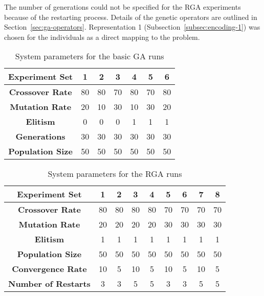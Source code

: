The number of generations could not be specified for the RGA experiments because of the restarting process. Details of the genetic operators are outlined in Section~\ref{sec:ga-operators}. Representation 1 (Subsection~\ref{subsec:encoding-1}) was chosen for the individuals as a direct mapping to the problem. 

\begin{table}
	\centering
	\begin{tabular}{ | >{\bfseries}c | c | c | c | c | c | c | }
		\hline
		Experiment Set & 1 & 2 & 3 & 4 & 5 & 6 \\ \hline
		Crossover Rate & 80 & 80 & 70 & 80 & 70 & 80 \\ \hline
		Mutation Rate & 20 & 10 & 30 & 10 & 30 & 20 \\ \hline
		Elitism & 0 & 0 & 0 & 1 & 1 & 1 \\ \hline
		Generations & 30 & 30 & 30 & 30 & 30 & 30 \\ \hline
		Population Size & 50 & 50 & 50 & 50 & 50 & 50 \\ \hline
	\end{tabular}
	\caption{System parameters for the basic GA runs}
	\label{table:viability-ga}
\end{table}

\begin{table}
	\centering
	\begin{tabular}{ | >{\bfseries}c | c | c | c | c | c | c | c | c | }
		\hline
		Experiment Set & 1 & 2 & 3 & 4 & 5 & 6 & 7 & 8 \\ \hline
		Crossover Rate & 80 & 80 & 80 & 80 & 70 & 70 & 70 & 70 \\ \hline
		Mutation Rate & 20 & 20 & 20 & 20 & 30 & 30 & 30 & 30 \\ \hline
		Elitism & 1 & 1 & 1 & 1 & 1 & 1 & 1 & 1 \\ \hline
		Population Size & 50 & 50 & 50 & 50 & 50 & 50 & 50 & 50 \\ \hline
		Convergence Rate & 10 & 5 & 10 & 5 & 10 & 5 & 10 & 5 \\ \hline
		Number of Restarts & 3 & 3 & 5 & 5 & 3 & 3 & 5 & 5 \\ \hline
	\end{tabular}
	\caption{System parameters for the RGA runs}
	\label{table:viability-rga}
\end{table}